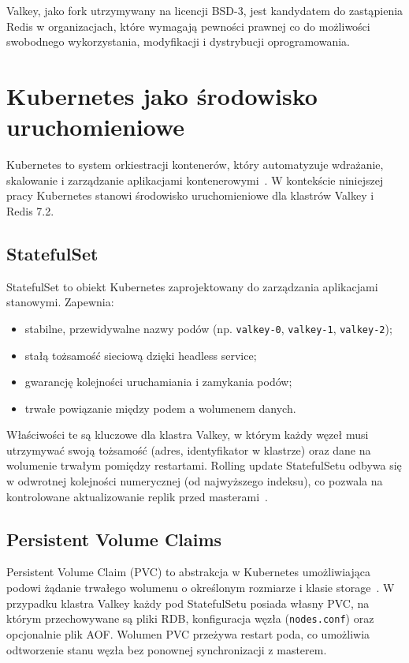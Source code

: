 Valkey, jako fork utrzymywany na licencji BSD-3, jest kandydatem do zastąpienia Redis w organizacjach, które wymagają pewności prawnej co do możliwości swobodnego wykorzystania, modyfikacji i dystrybucji oprogramowania.

\section{Kubernetes jako środowisko uruchomieniowe}\label{sec:kubernetes}

Kubernetes to system orkiestracji kontenerów, który automatyzuje wdrażanie, skalowanie i zarządzanie aplikacjami kontenerowymi~\cite{k8sDocumentation}. W kontekście niniejszej pracy Kubernetes stanowi środowisko uruchomieniowe dla klastrów Valkey i Redis 7.2.

\subsection{StatefulSet}

StatefulSet to obiekt Kubernetes zaprojektowany do zarządzania aplikacjami stanowymi. Zapewnia:

\begin{itemize}
    \item stabilne, przewidywalne nazwy podów (np. \texttt{valkey-0}, \texttt{valkey-1}, \texttt{valkey-2});
    \item stałą tożsamość sieciową dzięki headless service;
    \item gwarancję kolejności uruchamiania i zamykania podów;
    \item trwałe powiązanie między podem a wolumenem danych.
\end{itemize}

Właściwości te są kluczowe dla klastra Valkey, w którym każdy węzeł musi utrzymywać swoją tożsamość (adres, identyfikator w klastrze) oraz dane na wolumenie trwałym pomiędzy restartami. Rolling update StatefulSetu odbywa się w odwrotnej kolejności numerycznej (od najwyższego indeksu), co pozwala na kontrolowane aktualizowanie replik przed masterami~\cite{k8sStatefulSet}.

\subsection{Persistent Volume Claims}

Persistent Volume Claim (PVC) to abstrakcja w Kubernetes umożliwiająca podowi żądanie trwałego wolumenu o określonym rozmiarze i klasie storage~\cite{k8sPVC}. W przypadku klastra Valkey każdy pod StatefulSetu posiada własny PVC, na którym przechowywane są pliki RDB, konfiguracja węzła (\texttt{nodes.conf}) oraz opcjonalnie plik AOF. Wolumen PVC przeżywa restart poda, co umożliwia odtworzenie stanu węzła bez ponownej synchronizacji z masterem.

